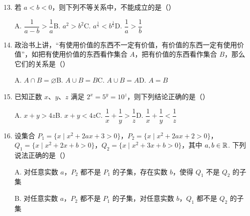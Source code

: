 \documentclass[a4paper,11pt]{article}
\begin{document}

\begin{enumerate}
\setcounter{enumi}{12}

\item 若 $a<b<0$，则下列不等关系中，不能成立的是\mbox{（\quad）}

\keepwithprev
A. $\dfrac{1}{a-b}>\dfrac1a$\qquad B. $a^2>b^2$\qquad C. $a^{\frac15}<b^{\frac15}$\qquad D. $\dfrac1a>\dfrac1b$

\ifanswer
\solbegin
{}
\solend
\fi

\item 政治书上讲，“有使用价值的东西不一定有价值，有价值的东西一定有使用价值”，如把有使用价值的东西看作集合 $A$，把有价值的东西看作集合 $B$，那么它们的关系是\mbox{（\quad）}

\keepwithprev
A. $A\cap B=\varnothing$\qquad B. $A\cup B=B$\qquad C. $A\cup B=A$\qquad D. $A=B$

\ifanswer
\solbegin
{}
\solend
\fi

\item 已知正数 $x$、$y$、$z$ 满足 $2^x=5^y=10^z$，则下列结论正确的是\mbox{（\quad）}

\keepwithprev
A. $x+y>4z$\qquad B. $x+y<4z$\qquad C. $\dfrac1x+\dfrac1y>\dfrac1z$\qquad D. $\dfrac1x+\dfrac1y<\dfrac1z$

\ifanswer
\solbegin
{}
\solend
\fi

\item 设集合 $P_1=\{x\mid x^2+2ax+3>0\}$，$P_2=\{x\mid x^2+2ax+2>0\}$，$Q_1=\{x\mid x^2+2x+b>0\}$，$Q_2=\{x\mid x^2+3x+b>0\}$，其中 $a,b\in\mathbb{R}$. 下列说法正确的是\mbox{（\quad）}

\keepwithprev
A. 对任意实数 $a$，$P_2$ 都不是 $P_1$ 的子集，存在实数 $b$，使得 $Q_1$ 不是 $Q_2$ 的子集

B. 对任意实数 $a$，$P_2$ 都不是 $P_1$ 的子集，对任意实数 $b$，$Q_1$ 都不是 $Q_2$ 的子集


\end{enumerate}
\end{document}
